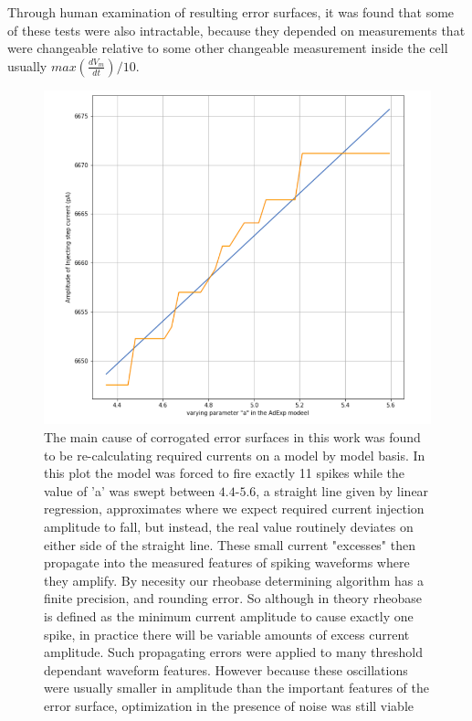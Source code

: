 Through human examination of resulting error surfaces, it was found that some of these tests were also intractable, because they depended on measurements that were changeable relative to some other changeable measurement inside the cell usually $max(\frac{dV_{m}}{dt})/10$.
\begin{center}
\begin{figure}
\includegraphics[]{figures/fundamental_cause_of_corrogations.png}
\caption[]{The main cause of corrogated error surfaces in this work was found to be re-calculating required currents on a model by model basis. In this plot the model was forced to fire exactly 11 spikes while the value of 'a' was swept between $4.4$-$5.6$, a straight line given by linear regression, approximates where we expect required current injection amplitude to fall, but instead, the real value routinely deviates on either side of the straight line. These small current "excesses" then propagate into the measured features of spiking waveforms where they amplify. By necesity our rheobase determining algorithm has a finite precision, and rounding error. So although in theory rheobase is defined as the minimum current amplitude to cause exactly one spike, in practice there will be variable amounts of excess current amplitude. Such propagating errors were applied to many threshold dependant waveform features. However because these oscillations were usually smaller in amplitude than the important features of the error surface, optimization in the presence of noise was still viable}
\end{figure}
\end{center}


